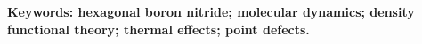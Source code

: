 
\vspace{5mm}

\noindent \textbf{Keywords: hexagonal boron nitride; molecular dynamics; density functional theory; thermal effects; point defects.} \textit{} %

